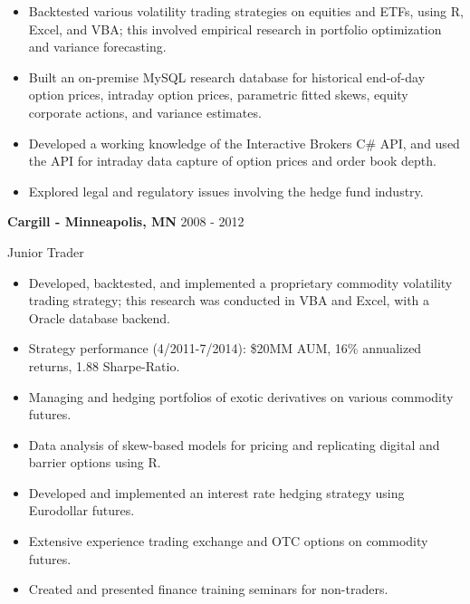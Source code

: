 \documentclass[11pt,a4paper,]{awesome-cv}
\begin{document}
\begin{itemize}
\item
  Backtested various volatility trading strategies on equities and ETFs,
  using R, Excel, and VBA; this involved empirical research in portfolio
  optimization and variance forecasting. \vspace{-0.5ex}
\item
  Built an on-premise MySQL research database for historical end-of-day
  option prices, intraday option prices, parametric fitted skews, equity
  corporate actions, and variance estimates. \vspace{-0.5ex}
\item
  Developed a working knowledge of the Interactive Brokers C\# API, and
  used the API for intraday data capture of option prices and order book
  depth. \vspace{-0.5ex}
\item
  Explored legal and regulatory issues involving the hedge fund
  industry.
\end{itemize}

\normalsize

\textbf{Cargill - Minneapolis, MN} \hfill 2008 - 2012

\vspace{-1ex}

Junior Trader

\vspace{-1.5ex}

\small

\begin{itemize}
\item
  Developed, backtested, and implemented a proprietary commodity
  volatility trading strategy; this research was conducted in VBA and
  Excel, with a Oracle database backend. \vspace{-0.5ex}
\item
  Strategy performance (4/2011-7/2014): \$20MM AUM, 16\% annualized
  returns, 1.88 Sharpe-Ratio. \vspace{-0.5ex}
\item
  Managing and hedging portfolios of exotic derivatives on various
  commodity futures. \vspace{-0.5ex}
\item
  Data analysis of skew-based models for pricing and replicating digital
  and barrier options using R. \vspace{-0.5ex}
\item
  Developed and implemented an interest rate hedging strategy using
  Eurodollar futures. \vspace{-0.5ex}
\item
  Extensive experience trading exchange and OTC options on commodity
  futures. \vspace{-0.5ex}
\item
  Created and presented finance training seminars for non-traders.
  \vspace{-0.5ex}
\end{itemize}
\end{document}
